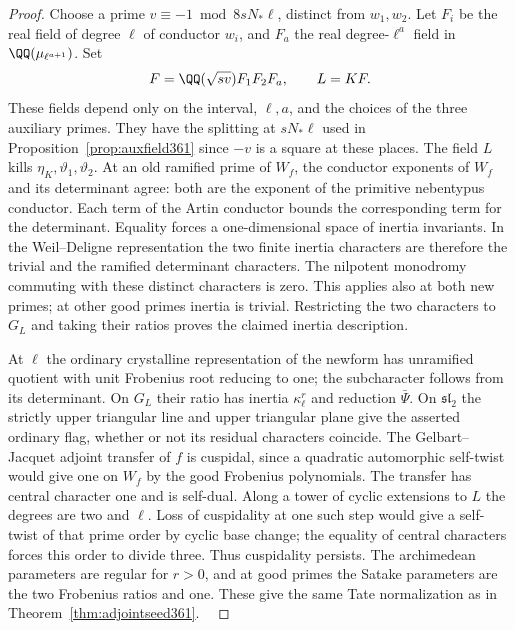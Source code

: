 \documentclass[a4paper,11pt]{article}
\theoremstyle{definition}
\theoremstyle{remark}
\numberwithin{equation}{section}
\begin{document}
\begin{proof}
Choose a prime \(v\equiv-1\bmod 8sN_*\ell\), distinct from
\(w_1,w_2\). Let \(F_i\) be the real field of degree \(\ell\)
of conductor \(w_i\), and \(F_a\) the real degree-\(\ell^a\)
field in \(\QQ(\mu_{\ell^{a+1}})\). Set
\[
        F=\QQ(\sqrt{sv})F_1F_2F_a,\qquad L=KF .
\]
These fields depend only on the interval, \(\ell,a\), and
the choices of the three auxiliary primes. They have the
splitting at \(sN_*\ell\) used in
Proposition~\ref{prop:auxfield361} since \(-v\) is a square
at these places. The field \(L\) kills \(\eta_K,\vartheta_1,
\vartheta_2\). At an old ramified prime of \(W_f\), the
conductor exponents of \(W_f\) and its determinant agree:
both are the exponent of the primitive nebentypus conductor.
Each term of the Artin conductor bounds the corresponding
term for the determinant. Equality forces a one-dimensional
space of inertia invariants. In the Weil--Deligne
representation the two finite inertia characters are
therefore the trivial and the ramified determinant
characters. The nilpotent monodromy commuting with these
distinct characters is zero. This applies also at both new
primes; at other good primes inertia is trivial. Restricting
the two characters to \(G_L\) and taking their ratios proves
the claimed inertia description.

At \(\ell\) the ordinary crystalline representation of the
newform has unramified quotient with unit Frobenius root
reducing to one; the subcharacter follows from its
determinant. On \(G_L\) their ratio has inertia
\(\kappa_\ell^r\) and reduction \(\bar\Psi\). On
\(\mathfrak{sl}_2\) the strictly upper triangular line
and upper triangular plane give the asserted ordinary
flag, whether or not its residual characters coincide.
The Gelbart--Jacquet adjoint transfer of \(f\) is cuspidal,
since a quadratic automorphic self-twist would give one on
\(W_f\) by the good Frobenius polynomials. The transfer has
central character one and is self-dual. Along a tower of
cyclic extensions to \(L\) the degrees are two and \(\ell\).
Loss of cuspidality at one such step would give a self-twist
of that prime order by cyclic base change; the equality of
central characters forces this order to divide three. Thus
cuspidality persists. The archimedean parameters are regular
for \(r>0\), and at good primes the Satake parameters are
the two Frobenius ratios and one. These give the same Tate
normalization as in Theorem~\ref{thm:adjointseed361}.
~\cite{XI-VIII-ordinary361,XI-VIII-VI-saito40,XI-VIII-I-gj123,XI-VIII-I-ac123}
\end{proof}
\end{document}
